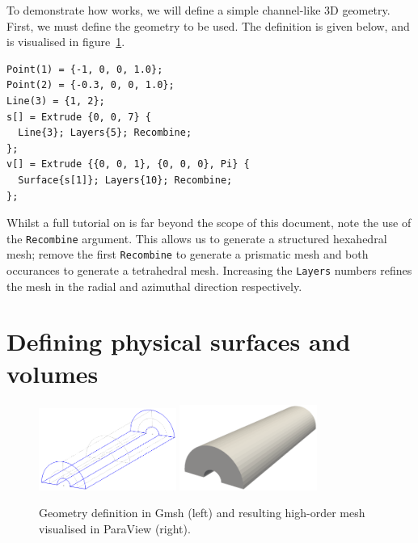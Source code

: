To demonstrate how \mc works, we will define a simple channel-like 3D geometry.
First, we must define the \gmsh geometry to be used. The \gmsh definition is
given below, and is visualised in figure~\ref{fig:util:mc:gmsh-example}.

\begin{lstlisting}[style=XmlStyle]
Point(1) = {-1, 0, 0, 1.0};
Point(2) = {-0.3, 0, 0, 1.0};
Line(3) = {1, 2};
s[] = Extrude {0, 0, 7} {
  Line{3}; Layers{5}; Recombine;
};
v[] = Extrude {{0, 0, 1}, {0, 0, 0}, Pi} {
  Surface{s[1]}; Layers{10}; Recombine;
};
\end{lstlisting}

Whilst a full tutorial on \gmsh is far beyond the scope of this document, note
the use of the \texttt{Recombine} argument. This allows us to generate a
structured hexahedral mesh; remove the first \texttt{Recombine} to generate a
prismatic mesh and both occurances to generate a tetrahedral mesh. Increasing
the \texttt{Layers} numbers refines the mesh in the radial and azimuthal
direction respectively.

\section{Defining physical surfaces and volumes}

\begin{figure}
  \begin{center}
    \includegraphics[width=0.4\textwidth]{img/mc-example-gmsh}
    \includegraphics[width=0.4\textwidth]{img/mc-example-mesh}
  \end{center}
  \caption{Geometry definition in Gmsh (left) and resulting high-order mesh
    visualised in ParaView (right).}
  \label{fig:util:mc:gmsh-example}
\end{figure}

